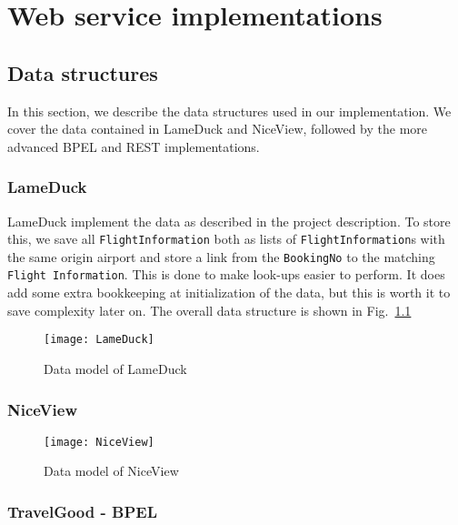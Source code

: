 {\setlength{\chapterfontsize}{23pt}
\chapter{Web service implementations}
}

\section{Data structures}
In this section, we describe the data structures used in our implementation. We cover the data contained in LameDuck and NiceView, followed by the more advanced BPEL and REST implementations.

\subsection{LameDuck}
LameDuck implement the data as described in the project description. To store this, we save all \texttt{FlightInformation} both as lists of \texttt{FlightInformation}s with the same origin airport and store a link from the \texttt{BookingNo} to the matching \texttt{Flight Information}. This is done to make look-ups easier to perform. It does add some extra bookkeeping at initialization of the data, but this is worth it to save complexity later on. The overall data structure is shown in Fig.~\ref{fig:lameduck_class}

\begin{figure}[H]
\centering
\texttt{[image: LameDuck]}
\caption{Data model of LameDuck}
\label{fig:lameduck_class}
\end{figure}


\subsection{NiceView}
\begin{figure}[H]
\centering
\texttt{[image: NiceView]}
\caption{Data model of NiceView}
\label{fig:niceview_class}
\end{figure}

\subsection{TravelGood - BPEL}


